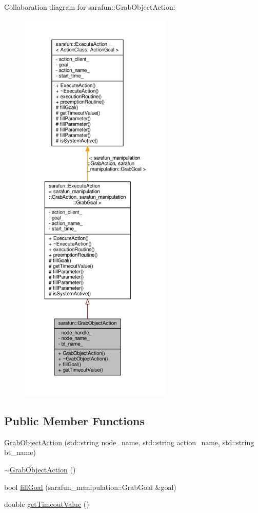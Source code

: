 Collaboration diagram for sarafun\-:\-:Grab\-Object\-Action\-:
\nopagebreak
\begin{figure}[H]
\begin{center}
\leavevmode
\includegraphics[height=550pt]{d7/d04/classsarafun_1_1GrabObjectAction__coll__graph}
\end{center}
\end{figure}
\subsection*{Public Member Functions}
\begin{DoxyCompactItemize}
\item 
\hyperlink{classsarafun_1_1GrabObjectAction_abca8f2d915cf1a8d507d04885b3e1df9_abca8f2d915cf1a8d507d04885b3e1df9}{Grab\-Object\-Action} (std\-::string node\-\_\-name, std\-::string action\-\_\-name, std\-::string bt\-\_\-name)
\item 
\hyperlink{classsarafun_1_1GrabObjectAction_a1b1ee63f9ba24332b2184b67021dbf0e_a1b1ee63f9ba24332b2184b67021dbf0e}{$\sim$\-Grab\-Object\-Action} ()
\item 
bool \hyperlink{classsarafun_1_1GrabObjectAction_a61fe8b0cb93dec244f10d6c5dbee913c_a61fe8b0cb93dec244f10d6c5dbee913c}{fill\-Goal} (sarafun\-\_\-manipulation\-::\-Grab\-Goal \&goal)
\item 
double \hyperlink{classsarafun_1_1GrabObjectAction_a6e2ee834fda8bd8d0dbdc101c8acdd9c_a6e2ee834fda8bd8d0dbdc101c8acdd9c}{get\-Timeout\-Value} ()
\end{DoxyCompactItemize}
